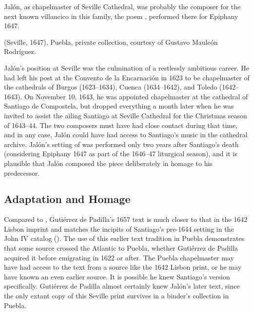 Jalón, as chapelmaster of Seville Cathedral, was probably the composer for the
next known villancico in this family, the poem ,
performed there for Epiphany 1647.%
\begin{Footnote}
     (Seville, 1647), Puebla, private collection,
    courtesy of Gustavo Mauleón Rodríguez.
\end{Footnote}
Jalón's position at Seville was the culmination of a restlessly ambitious
career.
He had left his post at the Convento de la Encarnación in 1623 to be
chapelmaster of the cathedrals of Burgos (1623--1634), Cuenca (1634--1642), and
Toledo (1642--1643).
On November 10, 1643, he was appointed chapelmaster at the cathedral of Santiago
de Compostela, but dropped everything a month later when he was invited to
assist the ailing Santiago at Seville Cathedral for the Christmas season of
1643--44.
The two composers must have had close contact during that time, and in any case,
Jalón could have had access to Santiago's music in the cathedral archive.
Jalón's setting of  was performed only two years after
Santiago's death (considering Epiphany 1647 as part of the 1646--47 liturgical
season), and it is plausible that Jalón composed the piece deliberately in
homage to his predecessor.


\subsection{Adaptation and Homage}

Compared to , Gutiérrez de Padilla's 1657 text  is much closer to that in the 1642 Lisbon imprint and matches
the incipits of Santiago's pre-1644 setting in the John IV catalog
().
The use of this earlier text tradition in Puebla demonstrates that some source
crossed the Atlantic to Puebla, whether Gutiérrez de Padilla acquired it before
emigrating in 1622 or after.
The Puebla chapelmaster may have had access to the text from a source like the
1642 Lisbon print, or he may have known an even earlier source.
It is possible he knew Santiago's version specifically.
Gutiérrez de Padilla almost certainly knew Jalón's later  text,
since the only extant copy of this Seville print survives in a binder's
collection in Puebla.

